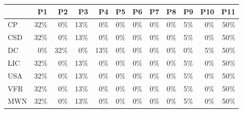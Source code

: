 \begin{figure*}[h]
	\centering
	\scriptsize
\begin{tabular}{lrrrrrrrrrrr}
\toprule
      & P1    & P2    & P3    & P4    & P5    & P6    & P7    & P8    & P9    & P10   & P11 \\
\midrule
CP    & \cellcolor{lightgreen}32\%  & \cellcolor{lightred}0\%   & \cellcolor{lightgreen}13\%  & \cellcolor{lightred}0\%   & \cellcolor{lightred}0\%   & \cellcolor{lightred}\cellcolor{lightred}0\%   & \cellcolor{lightred}0\%   & \cellcolor{lightred}0\%   & \cellcolor{lightblack}5\%   & \cellcolor{lightred}0\%   & \cellcolor{lightgreen}50\% \\
CSD   & \cellcolor{lightgreen}32\%  & \cellcolor{lightred}0\%   & \cellcolor{lightgreen}13\%  & \cellcolor{lightred}0\%   & \cellcolor{lightred}0\%   & \cellcolor{lightred}0\%   & \cellcolor{lightred}0\%   & \cellcolor{lightred}0\%   & \cellcolor{lightblack}5\%   & \cellcolor{lightred}0\%   & \cellcolor{lightgreen}50\% \\
DC    & \cellcolor{lightred}0\%   & \cellcolor{lightgreen}32\%  & \cellcolor{lightred}0\%   & \cellcolor{lightgreen}13\%  & \cellcolor{lightred}0\%   & \cellcolor{lightred}0\%   & \cellcolor{lightred}0\%   & \cellcolor{lightred}0\%   & \cellcolor{lightred}0\%   & \cellcolor{lightblack}5\%   & \cellcolor{lightgreen}50\% \\
LIC   & \cellcolor{lightgreen}32\%  & \cellcolor{lightred}0\%   & \cellcolor{lightgreen}13\%  & \cellcolor{lightred}0\%   & \cellcolor{lightred}0\%   & \cellcolor{lightred}0\%   & \cellcolor{lightred}0\%   & \cellcolor{lightred}0\%   & \cellcolor{lightblack}5\%   & \cellcolor{lightred}0\%   & \cellcolor{lightgreen}50\% \\
USA   & \cellcolor{lightgreen}32\%  & \cellcolor{lightred}0\%   & \cellcolor{lightgreen}13\%  & \cellcolor{lightred}0\%   & \cellcolor{lightred}0\%   & \cellcolor{lightred}0\%   & \cellcolor{lightred}0\%   & \cellcolor{lightred}0\%   & \cellcolor{lightblack}5\%   & \cellcolor{lightred}0\%   & \cellcolor{lightgreen}50\% \\
VFR   & \cellcolor{lightgreen}32\%  & \cellcolor{lightred}0\%   & \cellcolor{lightgreen}13\%  & \cellcolor{lightred}0\%   & \cellcolor{lightred}0\%   & \cellcolor{lightred}0\%   & \cellcolor{lightred}0\%   & \cellcolor{lightred}0\%   & \cellcolor{lightblack}5\%   & \cellcolor{lightred}0\%   & \cellcolor{lightgreen}50\% \\
MWN   & \cellcolor{lightgreen}32\%  & \cellcolor{lightred}0\%   & \cellcolor{lightgreen}13\%  & \cellcolor{lightred}0\%   & \cellcolor{lightred}0\%   & \cellcolor{lightred}0\%   & \cellcolor{lightred}0\%   & \cellcolor{lightred}0\%   & \cellcolor{lightblack}5\%   & \cellcolor{lightred}0\%   & \cellcolor{lightgreen}50\% \\

\end{tabular}
\end{figure*}
